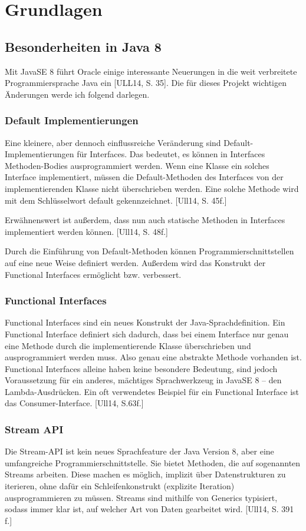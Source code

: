 \chapter{Grundlagen}
\section{Besonderheiten in Java 8} \label{sec:grundJava8}
Mit JavaSE 8 führt Oracle einige interessante Neuerungen in die weit verbreitete Programmiersprache Java ein [ULL14, S. 35]. Die für dieses Projekt wichtigen Änderungen werde ich folgend darlegen.
\subsection{Default Implementierungen} \label{sec:javaDefault}
Eine kleinere, aber dennoch einflussreiche Veränderung sind Default-Implementierungen für Interfaces. Das bedeutet, es können in Interfaces Methoden-Bodies ausprogrammiert werden. Wenn eine Klasse ein solches Interface implementiert, müssen die Default-Methoden des Interfaces von der implementierenden Klasse nicht überschrieben werden. Eine solche Methode wird mit dem Schlüsselwort default gekennzeichnet. [Ull14, S. 45f.]

Erwähnenswert ist außerdem, dass nun auch statische Methoden in Interfaces implementiert werden können. [Ull14, S. 48f.]

Durch die Einführung von Default-Methoden können Programmierschnittstellen auf eine neue Weise definiert werden. Außerdem wird das Konstrukt der Functional Interfaces ermöglicht bzw. verbessert.
\subsection{Functional Interfaces} \label{sec:javaFunctional}
Functional Interfaces sind ein neues Konstrukt der Java-Sprachdefinition. Ein Functional Interface definiert sich dadurch, dass bei einem Interface nur genau eine Methode durch die implementierende Klasse überschrieben und ausprogrammiert werden muss. Also genau eine abstrakte Methode vorhanden ist. Functional Interfaces alleine haben keine besondere Bedeutung, sind jedoch Voraussetzung für ein anderes, mächtiges Sprachwerkzeug in JavaSE 8 – den Lambda-Ausdrücken. Ein oft verwendetes Beispiel für ein Functional Interface ist das Consumer-Interface. [Ull14, S.63f.]
\subsection{Stream API} \label{sec:javaStream}
Die Stream-API ist kein neues Sprachfeature der Java Version 8, aber eine umfangreiche Programmierschnittstelle. Sie bietet Methoden, die auf sogenannten Streams arbeiten. Diese machen es möglich, implizit über Datenstrukturen zu iterieren, ohne dafür ein Schleifenkonstrukt (explizite Iteration) ausprogrammieren zu müssen. Streams sind mithilfe von Generics typisiert, sodass immer klar ist, auf welcher Art von Daten gearbeitet wird. [Ull14, S. 391 f.]

